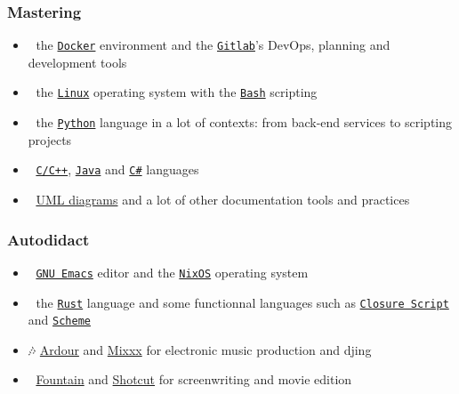 \documentclass[11pt]{article}
\begin{document}
\subsubsection{Mastering}
\label{sec:org9b80fb7}
\begin{itemize}
\item 🐋 the \href{https://www.docker.com/}{\texttt{Docker}} environment and the \href{https://about.gitlab.com/}{\texttt{Gitlab}}'s DevOps, planning and development tools
\item 🐧 the \href{https://kernel.org/}{\texttt{Linux}} operating system with the \href{https://www.gnu.org/software/bash/}{\texttt{Bash}} scripting
\item 🐍 the \href{https://www.python.org/}{\texttt{Python}} language in a lot of contexts: from back-end services to scripting projects
\item 🤖 \href{https://en.cppreference.com/w/}{\texttt{C/C++}}, \href{https://www.java.com/en/}{\texttt{Java}} and \href{https://dotnet.microsoft.com/en-us/}{\texttt{C\#}} languages
\item 📝 \href{https://www.uml-diagrams.org/}{UML diagrams} and a lot of other documentation tools and practices
\end{itemize}

\subsubsection{Autodidact}
\label{sec:org05fee0e}
\begin{itemize}
\item 🐄 \href{https://www.gnu.org/software/emacs/}{\texttt{GNU Emacs}} editor and the \href{https://nixos.org/}{\texttt{NixOS}} operating system
\item 🦀 the \href{https://www.rust-lang.org/}{\texttt{Rust}} language and some functionnal languages such as \href{https://clojurescript.org/}{\texttt{Closure Script}} and \href{http://www.call-cc.org/}{\texttt{Scheme}}
\item 🎶 \href{https://ardour.org/}{Ardour} and \href{https://mixxx.org/}{Mixxx} for electronic music production and djing
\item 🎥 \href{https://fountain.io/}{Fountain} and \href{https://www.shotcut.org/}{Shotcut} for screenwriting and movie edition
\end{itemize}
\end{document}
